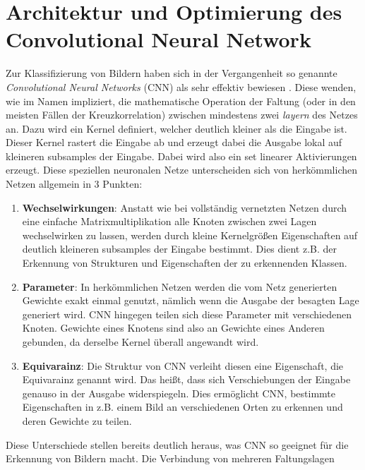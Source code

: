 \chapter{Architektur und Optimierung des Convolutional Neural Network}\label{sec:netze}%
Zur Klassifizierung von Bildern haben sich in der Vergangenheit so genannte
\textit{Convolutional Neural Networks} (CNN) als sehr effektiv bewiesen \cite{goodfellow}.
Diese wenden, wie im Namen impliziert, die mathematische Operation der Faltung
(oder in den meisten Fällen der Kreuzkorrelation) zwischen mindestens zwei
\textit{layern} des Netzes an.
Dazu wird ein Kernel definiert, welcher deutlich kleiner als die Eingabe ist.
Dieser Kernel rastert die Eingabe ab und erzeugt dabei die Ausgabe lokal auf
kleineren subsamples der Eingabe. Dabei wird also ein set linearer Aktivierungen
erzeugt.
Diese speziellen neuronalen Netze unterscheiden sich von herkömmlichen Netzen
allgemein in 3 Punkten:
%
\begin{enumerate}
  \item \textbf{Wechselwirkungen}: Anstatt wie bei vollständig vernetzten
  Netzen durch eine einfache Matrixmultiplikation alle Knoten zwischen zwei
  Lagen wechselwirken zu lassen, werden durch kleine Kernelgrößen
  Eigenschaften auf deutlich kleineren subsamples der Eingabe bestimmt. Dies dient
  z.B. der Erkennung von Strukturen und Eigenschaften der zu erkennenden Klassen.
  \item \textbf{Parameter}: In herkömmlichen Netzen werden die vom Netz
  generierten Gewichte exakt einmal genutzt, nämlich wenn die Ausgabe der
  besagten Lage generiert wird. CNN hingegen teilen sich diese Parameter mit
  verschiedenen Knoten. Gewichte eines Knotens sind also an Gewichte eines
  Anderen gebunden, da derselbe Kernel überall angewandt wird.
  \item \textbf{Equivarainz}: Die Struktur von CNN verleiht diesen eine
  Eigenschaft, die Equivarainz genannt wird. Das heißt, dass sich
  Verschiebungen der Eingabe genauso in der Ausgabe widerspiegeln. Dies ermöglicht
  CNN, bestimmte Eigenschaften in z.B. einem Bild an verschiedenen Orten zu erkennen
  und deren Gewichte zu teilen.
\end{enumerate}
%
Diese Unterschiede stellen bereits deutlich heraus, was CNN so geeignet für die
Erkennung von Bildern macht. Die Verbindung von mehreren Faltungslagen
